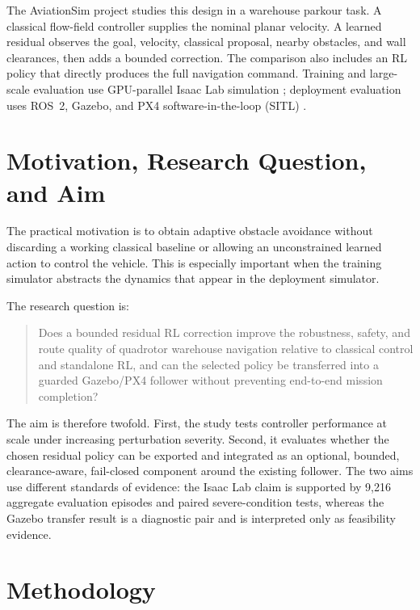 \documentclass[10pt,twocolumn]{article}
\begin{document}
The AviationSim project studies this design in a warehouse parkour task. A classical flow-field controller supplies the nominal planar velocity. A learned residual observes the goal, velocity, classical proposal, nearby obstacles, and wall clearances, then adds a bounded correction. The comparison also includes an RL policy that directly produces the full navigation command. Training and large-scale evaluation use GPU-parallel Isaac Lab simulation \cite{makoviychuk2021,mittal2025,rudin2022}; deployment evaluation uses ROS~2, Gazebo, and PX4 software-in-the-loop (SITL) \cite{koenig2004,meier2015}.

\section{Motivation, Research Question, and Aim}
The practical motivation is to obtain adaptive obstacle avoidance without discarding a working classical baseline or allowing an unconstrained learned action to control the vehicle. This is especially important when the training simulator abstracts the dynamics that appear in the deployment simulator.

The research question is:

\begin{quote}
Does a bounded residual RL correction improve the robustness, safety, and route quality of quadrotor warehouse navigation relative to classical control and standalone RL, and can the selected policy be transferred into a guarded Gazebo/PX4 follower without preventing end-to-end mission completion?
\end{quote}

The aim is therefore twofold. First, the study tests controller performance at scale under increasing perturbation severity. Second, it evaluates whether the chosen residual policy can be exported and integrated as an optional, bounded, clearance-aware, fail-closed component around the existing follower. The two aims use different standards of evidence: the Isaac Lab claim is supported by 9,216 aggregate evaluation episodes and paired severe-condition tests, whereas the Gazebo transfer result is a diagnostic pair and is interpreted only as feasibility evidence.

\section{Methodology}
\end{document}
